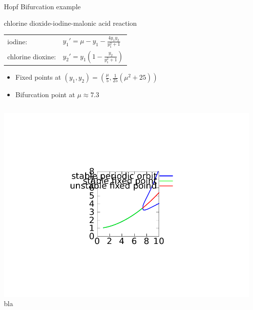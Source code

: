 \documentclass{beamer}
\begin{document}
\begin{frame}{Hopf Bifurcation example}
            \begin{exampleblock}{chlorine dioxide-iodine-malonic acid reaction}
                \begin{tabular}{l l}
                iodine: & $y_{1}' = \mu - y_{1} - \frac{4 y_{1} y_{2} }{ y_{1}^{2} + 1}$  \\
                chlorine dioxine: & $ y_{2}' = y_{1} (1 - \frac{y_{2}}{y_{1}^{2} + 1})$
                \end{tabular}
            \end{exampleblock}
            \begin{itemize}
                \item Fixed points at $(y_1, y_2) = (\frac{\mu}{5}, \frac{1}{25}(\mu^2 + 25) )$
                \item Bifurcation point at $\mu \approx 7.3$
            \end{itemize}
     \begin{columns}
         \includegraphics[width=\textwidth]{grafik/myrhshopf}
         bla
     \end{columns}
\end{frame}

\end{document}
